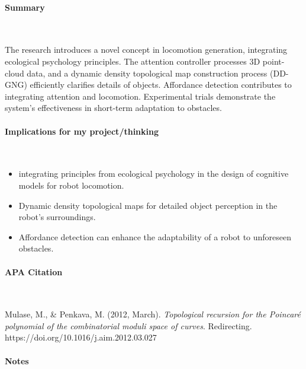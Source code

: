 \vspace*{-0.5cm}
\paragraph{Summary} \

The research introduces a novel concept in locomotion generation, integrating ecological psychology principles. The attention controller processes 3D point-cloud data, and a dynamic density topological map construction process (DD-GNG) efficiently clarifies details of objects. Affordance detection contributes to integrating attention and locomotion. Experimental trials demonstrate the system's effectiveness in short-term adaptation to obstacles.

\vspace*{-0.5cm}
\paragraph{Implications for my project/thinking} \

\begin{itemize}
    \item integrating principles from ecological psychology in the design of cognitive models for robot locomotion.
    \item Dynamic density topological maps for detailed object perception in the robot's surroundings.
    \item Affordance detection can enhance the adaptability of a robot to unforeseen obstacles.
\end{itemize}

\newpage

\vspace*{-0.5cm}
\paragraph{APA Citation} \

\begin{hangparas}{.25in}{1}
Mulase, M., \& Penkava, M. (2012, March). \textit{Topological recursion for the Poincaré polynomial of the combinatorial moduli space of curves}. Redirecting. https://doi.org/10.1016/j.aim.2012.03.027 
\end{hangparas}

\vspace*{-0.5cm}
\paragraph{Notes} \

